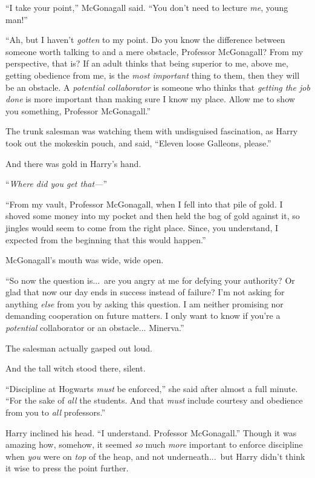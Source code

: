 “I take your point,” McGonagall said. “You don’t need to lecture \emph{me}, young man!”

“Ah, but I haven’t \emph{gotten} to my point. Do you know the difference between someone worth talking to and a mere obstacle, Professor McGonagall? From my perspective, that is? If an adult thinks that being superior to me, above me, getting obedience from me, is the \emph{most important} thing to them, then they will be an obstacle. A \emph{potential collaborator} is someone who thinks that \emph{getting the job done} is more important than making sure I know my place. Allow me to show you something, Professor McGonagall.”

The trunk salesman was watching them with undisguised fascination, as Harry took out the mokeskin pouch, and said, “Eleven loose Galleons, please.”

And there was gold in Harry’s hand.

“\emph{Where did you get that—}”

“From my vault, Professor McGonagall, when I fell into that pile of gold. I shoved some money into my pocket and then held the bag of gold against it, so jingles would seem to come from the right place. Since, you understand, I expected from the beginning that this would happen.”

McGonagall’s mouth was wide, wide open.

“So now the question is...\ are you angry at me for defying your authority? Or glad that now our day ends in success instead of failure? I’m not asking for anything \emph{else} from you by asking this question. I am neither promising nor demanding cooperation on future matters. I only want to know if you’re a \emph{potential} collaborator or an obstacle... Minerva.”

The salesman actually gasped out loud.

And the tall witch stood there, silent.

“Discipline at Hogwarts \emph{must} be enforced,” she said after almost a full minute. “For the sake of \emph{all} the students. And that \emph{must} include courtesy and obedience from you to \emph{all} professors.”

Harry inclined his head. “I understand. Professor McGonagall.” Though it was amazing how, somehow, it seemed \emph{so} much \emph{more} important to enforce discipline when \emph{you} were on \emph{top} of the heap, and not underneath...\ but Harry didn’t think it wise to press the point further.

